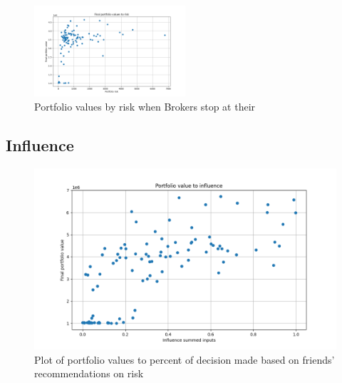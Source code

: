 \documentclass[letterpaper, 11 pt, proceedings]{IEEEtran}
\begin{document}
	\begin{figure}[h]
		\centering
		\includegraphics[width=0.5\textwidth]{valueToRisk_stopatstable.png}
		\caption{Portfolio values by risk when Brokers stop at their }
		\label{stopatstable}
	\end{figure}
	\FloatBarrier
	
	\subsection{Influence}
	
	\begin{figure}[h]
		\centering
		\includegraphics[width=.5\textwidth]{valueToInfluence_influence04.png}
		\caption{Plot of portfolio values to percent of decision made based on friends' recommendations on risk}
		\label{fig:value_to_influence_influencerun}
	\end{figure}	
	\FloatBarrier
\end{document}
